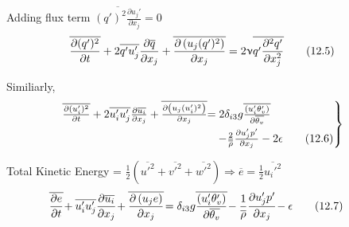 \documentclass[fleqn,10pt]{SelfArx} %
\begin{document}
Adding flux term \( \overline{(q')^2 \frac{\partial u_j'}{\partial x_j}} = 0 \)
\begin{align*}
	\mspace{-15mu} \overline{\frac{\partial (q')^2}{\partial t}} + 2\overline{q'u_j'}\frac{\partial \overline{q}}{\partial x_j} + \overline{\frac{\partial \left(u_j(q')^2 \right)}{\partial x_j}} = 2\upnu \overline{q'\frac{\partial^2 q'}{\partial x_j^2}} \tag{12.5} \label{eq:12.5}
\end{align*}

Similiarly,
\begin{align*}
	\begin{rcases}
		\mspace{-15mu} \overline{\frac{\partial (u_i')^2}{\partial t}} + 2\overline{u_i'u_j'}\frac{\partial \overline{u_i}}{\partial x_j} + \overline{\frac{\partial \left(u_j(u_i')^2 \right)}{\partial x_j}} & \!\!\!\!\!\! = 2\delta_{i3}g \overline{\frac{(u_i' \theta_v')}{\partial \overline{\theta_v}}} \\ &- \frac{2}{\overline{\rho}}\frac{\partial u_j' p'}{\partial x_j} - 2\epsilon \tag{12.6} \label{eq:12.6}
	\end{rcases}
\end{align*}

Total Kinetic Energy = \( \frac{1}{2}\left(\overline{u'^2} + \overline{v'^2} + \overline{w'^2}\right) \Rightarrow \overline{e} = \frac{1}{2}\overline{u_i'^2} \)
\begin{align*}
	\mspace{-35mu} \overline{\frac{\partial e}{\partial t}} \! + \overline{u_i'u_j'}\frac{\partial \overline{u_i}}{\partial x_j} \! + \overline{\frac{\partial \left(u_j e \right)}{\partial x_j}} \! = \delta_{i3}g \overline{\frac{(u_i' \theta_v')}{\partial \overline{\theta_v}}} \! - \frac{1}{\overline{\rho}}\frac{\partial u_j' p'}{\partial x_j} \! - \epsilon \tag{12.7} \label{eq:12.7}
\end{align*}
\end{document}
